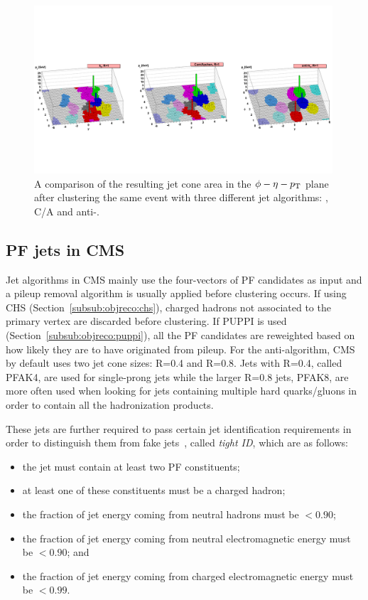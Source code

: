 \begin{figure}[h!] 
    \centering
    \includegraphics[width=0.99\textwidth]{figures/event_reconstruction/clustering_algos.pdf}
    \caption{A comparison of the resulting jet cone area in the $\phi-\eta-p_{\mathrm{T}}$ plane after clustering the same event with three different jet algorithms: \kt, C/A and anti-\kt. ~\cite{Cacciari:2008gp}}
    \label{fig:objreco:jetalgo_comp}
\end{figure}

\subsection{PF jets in CMS}
Jet algorithms in CMS mainly use the four-vectors of PF candidates as input and a pileup removal algorithm is usually applied before clustering occurs. If using CHS (Section~\ref{subsub:objreco:chs}), charged hadrons not associated to the primary vertex are discarded before clustering. If PUPPI is used (Section~\ref{subsub:objreco:puppi}), all the PF candidates are reweighted based on how likely they are to have originated from pileup. 
For the anti-\kt algorithm, CMS by default uses two jet cone sizes: R=0.4 and R=0.8. Jets with R=0.4, called PFAK4, are used for single-prong jets while the larger R=0.8 jets, PFAK8, are more often used when looking for jets containing multiple hard quarks/gluons in order to contain all the hadronization products.\par
These jets are further required to pass certain jet identification requirements in order to distinguish them from fake jets~\cite{jetID_JME}, called \textit{tight ID}, which are as follows:
\begin{itemize}
  \itemsep0em 
\item the jet must contain at least two PF constituents;
\item at least one of these constituents must be a charged hadron;
\item the fraction of jet energy coming from neutral hadrons must be $< 0.90$;
\item the fraction of jet energy coming from neutral electromagnetic energy must be $< 0.90$; and
\item the fraction of jet energy coming from charged electromagnetic energy must be $< 0.99$.
\end{itemize} 


